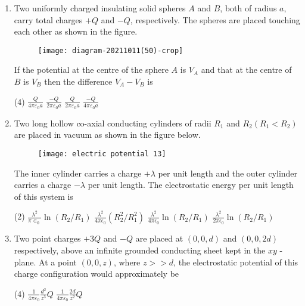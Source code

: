 \begin{enumerate}[label=\color{ocre}\textbf{\arabic*.}]
\item Two uniformly charged insulating solid spheres $A$ and $B$, both of radius $a$, carry total charges $+Q$ and $-Q$, respectively. The spheres are placed touching each other as shown in the figure.\\
\begin{figure}[H]
	\centering
	\texttt{[image: diagram-20211011(50)-crop]}
\end{figure}
If the potential at the centre of the sphere $A$ is $V_{A}$ and that at the centre of $B$ is $V_{B}$ then the difference $V_{A}-V_{B}$ is
{}
\begin{tasks}(4)
	\task[\textbf{A.}] $\frac{Q}{4 \pi \varepsilon_{0} a}$
	\task[\textbf{B.}] $\frac{-Q}{2 \pi \varepsilon_{0} a}$
	\task[\textbf{C.}] $\frac{Q}{2 \pi \varepsilon_{0} a}$
	\task[\textbf{D.}] $\frac{-Q}{4 \pi \varepsilon_{0} a}$
\end{tasks}
\item Two long hollow co-axial conducting cylinders of radii $R_{1}$ and $R_{2}\left(R_{1}<R_{2}\right)$ are placed in vacuum as shown in the figure below.\\
\begin{figure}[H]
	\centering
	\texttt{[image: electric potential 13]}
\end{figure}
The inner cylinder carries a charge $+\lambda$ per unit length and the outer cylinder carries a charge $-\lambda$ per unit length. The electrostatic energy per unit length of this system is
{}
\begin{tasks}(2)
	\task[\textbf{A.}] $\frac{\lambda^{2}}{\pi \in_{0}} \ln \left(R_{2} / R_{1}\right)$
	\task[\textbf{B.}] $\frac{\lambda^{2}}{4 \pi \epsilon_{0}}\left(R_{2}^{2} / R_{1}^{2}\right)$
	\task[\textbf{C.}] $\frac{\lambda^{2}}{4 \pi \epsilon_{0}} \ln \left(R_{2} / R_{1}\right)$
	\task[\textbf{D.}] $\frac{\lambda^{2}}{2 \pi \epsilon_{0}} \ln \left(R_{2} / R_{1}\right)$
\end{tasks}
\item Two point charges $+3 Q$ and $-Q$ are placed at $(0,0, d)$ and $(0,0,2 d)$ respectively, above an infinite grounded conducting sheet kept in the $x y$ - plane. At a point $(0,0, z)$, where $z>>d$, the electrostatic potential of this charge configuration would approximately be
{}
\begin{tasks}(4)
	\task[\textbf{A.}] $\frac{1}{4 \pi \varepsilon_{0}} \frac{d^{2}}{z^{3}} Q$
	\task[\textbf{B.}] $\frac{1}{4 \pi \varepsilon_{0}} \frac{2 d}{z^{2}} Q$

\end{tasks}
\end{enumerate}
